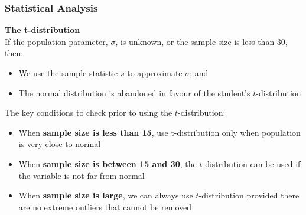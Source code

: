 \documentclass{beamer}
\begin{document}
\begin{frame}
\frametitle{Statistical Analysis}
\textbf{The t-distribution}\\
\vspace{0.1cm}
If the population parameter, $\sigma$, is unknown, or the sample size is less than 30, then: 
\begin{itemize}
\item We use the sample statistic $s$ to approximate $\sigma$; and
\item The normal distribution is abandoned in favour of the student's $t$-distribution
\end{itemize}
\vspace{0.1cm}
\begin{tcolorbox}
The key conditions to check prior to using the $t$-distribution:\\
\vspace{-0.5cm}
\begin{itemize}
\item When \textbf{sample size is less than 15}, use t-distribution only when population is very close to normal
\vspace{0.1cm}
\item When \textbf{sample size is between 15 and 30}, the $t$-distribution can be used if the variable is not far from normal
\vspace{0.1cm}
\item When \textbf{sample size is large}, we can always use $t$-distribution provided there are no extreme outliers that cannot be removed
\end{itemize}
\end{tcolorbox}
\end{frame}
\end{document}
